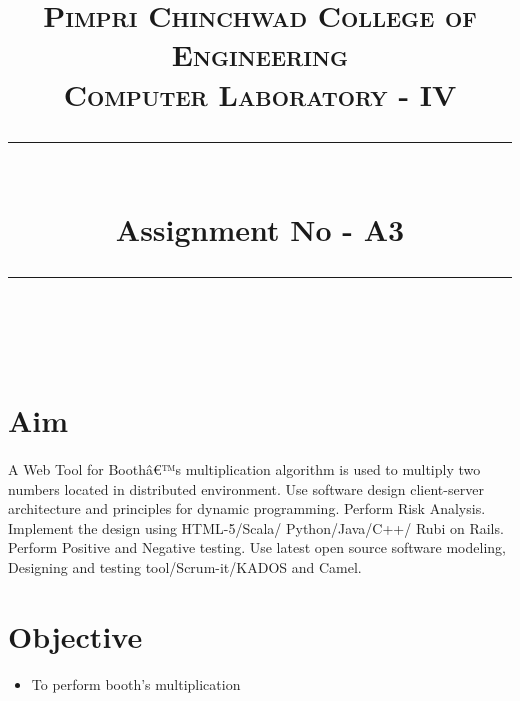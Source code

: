 \documentclass[a4paper,12pt]{article}
\title{
	\normalfont \normalsize 
	\textsc{Pimpri Chinchwad College of Engineering \\ 
		Computer Laboratory - IV} \\
	[10pt] 
	\rule{\linewidth}{0.5pt} \\[6pt] 
	\huge Assignment No - A3 \\
	\rule{\linewidth}{2pt}  \\[10pt]
}
\author{}
\date{\normalsize}
\newenvironment{codefont}{\fontfamily{ccr}\selectfont}{\par}
\begin{document}
\maketitle

\section{Aim}
	\paragraph{} A Web Tool for Boothâ€™s multiplication algorithm is used to multiply two numbers located in distributed
	environment. Use software design client-server architecture and principles for dynamic programming.
	Perform Risk Analysis. Implement the design using HTML-5/Scala/ Python/Java/C++/ Rubi on Rails.
	Perform Positive and Negative testing. Use latest open source software modeling, Designing and testing
	tool/Scrum-it/KADOS and Camel.
	
\section{Objective}
	\begin{itemize}
		\item To perform booth's multiplication
	\end{itemize}
	
\end{document}
